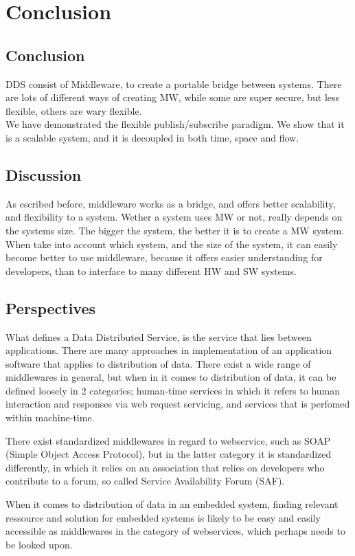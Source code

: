 \chapter{Conclusion}
\section{Conclusion}
DDS consist of Middleware, to create a portable bridge between systems. 
There are lots of different ways of creating MW, while some are super secure, but less flexible, others are wary flexible. \\
We have demonstrated the flexible publish/subscribe paradigm. We show that it is a scalable system, and it is decoupled in both time, space and flow.

\section{Discussion}
As escribed before, middleware works as a bridge, and offers better scalability, and flexibility to a system. Wether a system uses MW or not, really depends on the systems size. The bigger the system, the better it is to create a MW system. When take into account which system, and the size of the system, it can easily become better to use middleware, because it offers easier understanding for developers, than to interface to many different HW and SW systems.\\

\section{Perspectives}
What defines a Data Distributed Service, is the service that lies between applications. There are many approaches in implementation of an application software that applies to distribution of data. There exist a wide range of middlewares in general, but when in it comes to distribution of data, it can be defined loosely in 2 categories; human-time services in which it refers to human interaction and responses via web request servicing, and services that is perfomed within machine-time.

There exist standardized middlewares in regard to webservice, such as SOAP (Simple Object Access Protocol), but in the latter category it is standardized differently, in which it relies on an association that relies on developers who contribute to a forum, so called Service Availability Forum (SAF).

When it comes to distribution of data in an embedded system, finding relevant ressource and solution for embedded systems is likely to be easy and easily accessible as middlewares in the category of webservices, which perhaps needs to be looked upon.
